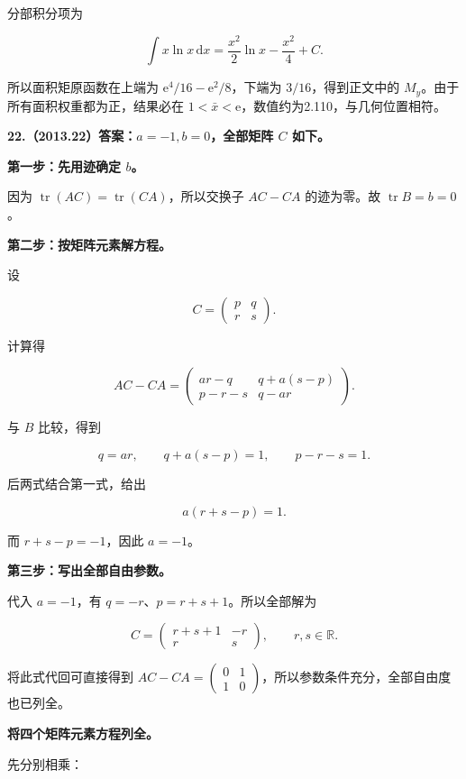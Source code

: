 \documentclass[UTF8,11pt,fontset=windows]{ctexart}
\begin{document}
分部积分项为

$$
\int x\ln x\,\mathrm dx
=\frac{x^2}{2}\ln x-\frac{x^2}{4}+C.
$$

所以面积矩原函数在上端为 $\mathrm e^4/16-\mathrm e^2/8$，下端为 $3/16$，得到正文中的 $M_y$。由于所有面积权重都为正，结果必在 $1<\bar x<\mathrm e$，数值约为2.110，与几何位置相符。

\clearpage

\textbf{22.（2013.22）答案：$a=-1,b=0$，全部矩阵 $C$ 如下。}

\textbf{第一步：先用迹确定 $b$。}

因为 $\operatorname{tr}(AC)=\operatorname{tr}(CA)$，所以交换子 $AC-CA$ 的迹为零。故 $\operatorname{tr}B=b=0$。

\textbf{第二步：按矩阵元素解方程。}

设

$$
C=\begin{pmatrix}p&q\\r&s\end{pmatrix}.
$$

计算得

$$
AC-CA=\begin{pmatrix}
ar-q&q+a(s-p)\\
p-r-s&q-ar
\end{pmatrix}.
$$

与 $B$ 比较，得到

$$
q=ar,\qquad q+a(s-p)=1,\qquad p-r-s=1.
$$

后两式结合第一式，给出

$$
a(r+s-p)=1.
$$

而 $r+s-p=-1$，因此 $a=-1$。

\textbf{第三步：写出全部自由参数。}

代入 $a=-1$，有 $q=-r$、$p=r+s+1$。所以全部解为

$$
C=\begin{pmatrix}r+s+1&-r\\r&s\end{pmatrix},
\qquad r,s\in\mathbb R.
$$

将此式代回可直接得到 $AC-CA=\begin{pmatrix}0&1\\1&0\end{pmatrix}$，所以参数条件充分，全部自由度也已列全。

\textbf{将四个矩阵元素方程列全。}

先分别相乘：
\end{document}
